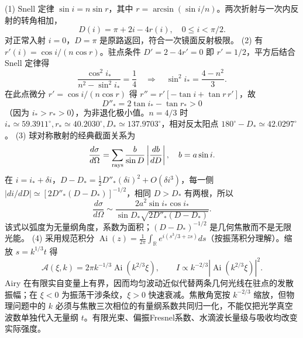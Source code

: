 (1) Snell 定律 \(\sin i=n\sin r\)，其中 \(r=\arcsin(\sin i/n)\)。两次折射与一次内反射的转角相加，
\[
\boxed{D(i)=\pi+2i-4r(i)},\quad 0\le i<\pi/2.
\]
对正常入射 \(i=0\)，\(D=\pi\) 是原路返回，符合一次镜面反射极限。
(2) 有 \(r'(i)=\cos i/(n\cos r)\)。驻点条件 \(D'=2-4r'=0\) 即 \(r'=1/2\)，平方后结合 Snell 定律得
\[
\frac{\cos^2i_*}{n^2-\sin^2i_*}=\frac14\quad\Longrightarrow\quad
\boxed{\sin^2i_*=\frac{4-n^2}{3}}.
\]
在此点微分 \(r'=\cos i/(n\cos r)\) 得 \(r''=r'[-\tan i+\tan r\,r']\)，故
\[
D''_*=2\tan i_*-\tan r_*>0
\]
（因为 \(i_*>r_*>0\)），为非退化极小值。\(n=4/3\) 时 \(i_*\simeq59.3911^\circ,r_*\simeq40.2030^\circ,D_*\simeq137.9703^\circ\)，相对反太阳点 \(180^\circ-D_*\simeq42.0297^\circ\)。
(3) 球对称散射的经典截面关系为
\[
\frac{d\sigma}{d\Omega}=\sum_{\rm rays}\frac{b}{\sin D}\left|\frac{db}{dD}\right|,
\quad b=a\sin i.
\]
在 \(i=i_*+\delta i\)，\(D-D_*=\tfrac12 D''_*(\delta i)^2+O(\delta i^3)\)，每一侧 \(|di/dD|\simeq[2D''_*(D-D_*)]^{-1/2}\)，相同 \(D>D_*\) 有两根，所以
\[
\boxed{\frac{d\sigma}{d\Omega}\sim
\frac{2a^2\sin i_*\cos i_*}{\sin D_*\sqrt{2D''_*(D-D_*)}}}.
\]
该式以弧度为无量纲角度，系数为面积；\((D-D_*)^{-1/2}\) 是几何焦散而不是无限光能。
(4) 采用规范积分 \(\operatorname{Ai}(z)=\frac1{2\pi}\int_{\mathbb R}e^{i(s^3/3+zs)}ds\)（按振荡积分理解）。缩放 \(s=k^{1/3}t\) 得
\[
\mathcal A(\xi,k)=2\pi k^{-1/3}\operatorname{Ai}(k^{2/3}\xi),\qquad I\propto k^{-2/3}|\operatorname{Ai}(k^{2/3}\xi)|^2.
\]
Airy 在有限实自变量上有界，因而均匀波动近似代替两条几何光线在驻点的发散振幅；在 \(\xi<0\) 为振荡干涉条纹，\(\xi>0\) 快速衰减。焦散角宽按 \(k^{-2/3}\) 缩放，但物理问题中的 \(k\) 必须与焦散三次相位的有量纲系数共同归一化，不能仅把光学真空波数单独代入无量纲 \(t\)。有限光束、偏振Fresnel系数、水滴波长量级与吸收均改变实际强度。
